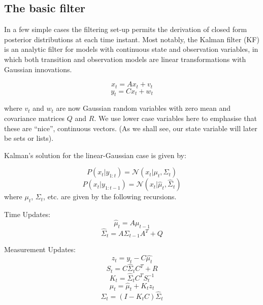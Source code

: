 \subsection{The basic filter}

In a few simple cases the filtering set-up permits the derivation of closed form posterior distributions at each time instant. Most notably, the Kalman filter (KF) \cite{Kalman1960} is an analytic filter for models with continuous state and observation variables, in which both transition and observation models are linear transformations with Gaussian innovations.

\begin{equation}
x_t = A x_t + v_t
\label{eq:LinearFilterEq1}
\end{equation}
\begin{equation}
y_t = C x_t + w_t
\label{eq:LinearFilterEq2}
\end{equation}

where $v_t$ and $w_t$ are now Gaussian random variables with zero mean and covariance matrices $Q$ and $R$. We use lower case variables here to emphasise that these are ``nice'', continuous vectors. (As we shall see, our state variable will later be sets or lists).

Kalman's solution for the linear-Gaussian case is given by:

\begin{equation}
P(x_t|y_{1:t}) = \mathcal{N}(x_t|\mu_t, \Sigma_t )
\label{eq:KF}
\end{equation}
\begin{equation}
P(x_t|y_{1:t-1}) = \mathcal{N}(x_t|\hat{\mu}_t, \hat{\Sigma}_t )
\label{eq:KFp}
\end{equation}
where $\mu_t$, $\Sigma_t$, etc. are given by the following recursions.

Time Updates:
\begin{equation}
\hat{\mu}_t = A \mu_{t-1}
\label{eq:KFTime1}
\end{equation}
\begin{equation}
\hat{\Sigma}_t = A \Sigma_{t-1} A^{T} + Q
\label{eq:KFTime2}
\end{equation}

Measurement Updates:
\begin{equation}
z_t = y_t - C \hat{\mu_t}
\label{eq:KFMeas1}
\end{equation}
\begin{equation}
S_t = C \hat{\Sigma}_t C^{T} + R
\label{eq:KFMeas2}
\end{equation}
\begin{equation}
K_t = \hat{\Sigma}_t C^{T} S_t^{-1}
\label{eq:KFMeas3}
\end{equation}
\begin{equation}
\mu_t = \hat{\mu}_t + K_t z_t
\label{eq:KFMeas4}
\end{equation}
\begin{equation}
\Sigma_t = (I - K_t C) \hat{\Sigma}_t
\label{eq:KFMeas5}
\end{equation}

